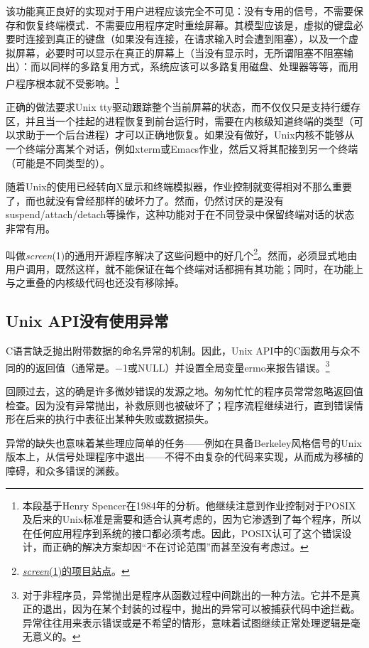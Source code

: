 \documentclass[12pt,oneside]{book}
\begin{document}
该功能真正良好的实现对于用户进程应该完全不可见：没有专用的信号，不需要保存和恢复终端模式．不需要应用程序定时重绘屏幕。其模型应该是，虚拟的键盘必要时连接到真正的键盘（如果没有连接，在请求输入时会遭到阻塞），以及一个虚拟屏幕，必要时可以显示在真正的屏幕上（当没有显示时，无所谓阻塞不阻塞输出）：而以同样的多路复用方式，系统应该可以多路复用磁盘、处理器等等，而用户程序根本就不受影响。\footnote{本段基于Henry Spencer在1984年的分析。他继续注意到作业控制对于POSIX及后来的Unix标准是需要和适合认真考虑的，因为它渗透到了每个程序，所以在任何应用程序到系统的接口都必须考虑。因此，POSIX认可了这个错误设计，而正确的解决方案却因“不在讨论范围”而甚至没有考虑过。}

正确的做法要求Unix tty驱动跟踪整个当前屏幕的状态，而不仅仅只是支持行缓存区，并且当一个挂起的进程恢复到前台运行时，需要在内核级知道终端的类型（可以求助于一个后台进程）才可以正确地恢复。如果没有做好，Unix内核不能够从一个终端分离某个对话，例如xterm或Emacs作业，然后又将其配接到另一个终端（可能是不同类型的）。

随着Unix的使用已经转向X显示和终端模拟器，作业控制就变得相对不那么重要了，而也就没有曾经那样的破坏力了。然而，仍然讨厌的是没有suspend/attach/detach等操作，这种功能对于在不同登录中保留终端对话的状态非常有用。

叫做\textit{screen}(1)的通用开源程序解决了这些问题中的好几个\footnote{\href{http://www.math.fu-berlin.de/~guckes/screen/}{\textit{screen}(1)的项目站点}。}。然而，必须显式地由用户调用，既然这样，就不能保证在每个终端对话都拥有其功能；同时，在功能上与之重叠的内核级代码也还没有移除掉。

\subsection{Unix API没有使用异常}
C语言缺乏抛出附带数据的命名异常的机制。因此，Unix API中的C函数用与众不同的的返回值（通常是。−1或NULL）并设置全局变量ermo来报告错误。\footnote{对于非程序员，异常抛出是程序从函数过程中间跳出的一种方法。它并不是真正的退出，因为在某个封装的过程中，抛出的异常可以被捕获代码中途拦截。异常往往用来表示错误或是不希望的情形，意味着试图继续正常处理逻辑是毫无意义的。}

回顾过去，这的确是许多微妙错误的发源之地。匆匆忙忙的程序员常常忽略返回值检查。因为没有异常抛出，补救原则也被破坏了；程序流程继续进行，直到错误情形在后来的执行中表征出某种失败或数据损失。

异常的缺失也意味着某些理应简单的任务——例如在具备Berkeley风格信号的Unix版本上，从信号处理程序中退出——不得不由复杂的代码来实现，从而成为移植的障碍，和众多错误的渊薮。
\end{document}
